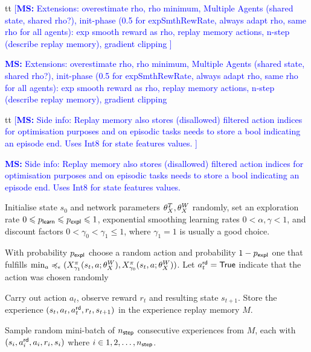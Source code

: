 \documentclass[envcountsame]{llncs}
\newcommand\MS[2][r]{\ifx t#1 \textcolor{blue}{[\textbf{MS:} #2]}
  \else \begin{center}\textcolor{blue}{\textbf{MS:} #2} \end{center} \fi}
\begin{document}
\MS[t]{Extensions: overestimate rho, rho minimum, Multiple Agents (shared state,  shared rho?),
  init-phase (0.5 for expSmthRewRate, always adapt rho, same rho for all agents): exp smooth reward
  as rho, replay memory actions, n-step (describe replay memory), gradient clipping }
\MS[t]{Side info: Replay memory also stores (disallowed) filtered action indices for optimisation purposes and on
episodic tasks needs to store a bool indicating an episode end. Uses Int8 for state features values.  }


\begin{algorithm}[t!]
  \begin{algorithmic}[1]
    \State{}Initialise state \(s_{0}\) and network parameters \(\theta_X^{T}, \theta_X^{W}\) randomly, set
    an exploration rate \(0 \leqslant p_{\mathsf{learn}} \leqslant p_{\mathsf{expl}} \leqslant 1\), exponential smoothing learning rates
    \(0 < \alpha, \gamma < 1\), and discount factors
    \(0 < \gamma_{0} < \gamma_{1} \leqslant 1\), where \(\gamma_{1} = 1\) is
    usually a good choice.
    \State{}%
    \begin{minipage}[t]{\dimexpr\textwidth-\leftmargin-\labelsep-\labelwidth}
      With probability \(p_{\mathsf{expl}}\) choose a random action and
      probability \(1-p_{\mathsf{expl}}\) one that fulfills
      \(\min_{a}\preccurlyeq_{\epsilon}(X^{\pi}_{\gamma_{1}}(s_{t},a; \theta_X^{W}{}),X^\pi_ {\gamma_{0}}(s_{t},a;
      \theta_X^{W}{}))\). Let \(a_{t}^{\mathsf{rd}} = \mathsf{True}\) indicate that the action was chosen
      randomly
    \end{minipage}
    \State{}%
    \begin{minipage}[t]{\dimexpr\textwidth-\leftmargin-\labelsep-\labelwidth}
    Carry out action \(a_{t}\), observe reward \(r_{t}\) and resulting state \(s_{t+1}\).
    Store the experience \((s_{t}, a_{t}, a_{t}^{\mathsf{rd}}, r_{t}, s_{t+1})\) in the experience replay
    memory \(M\).
    \end{minipage}
    \State{}%
    \begin{minipage}[t]{\dimexpr\textwidth-\leftmargin-\labelsep-\labelwidth-\leftmargin+2pt}
      Sample random mini-batch of \(n_{\mathsf{step}}\) consecutive experiences from \(M\), each with
      \((s_{i}, a_{i}^{\mathsf{rd}}, a_{i}, r_{i}, s_{i})\) where \(i \in {1,2,\ldots,n_{\mathsf{step}}}\).
    \end{minipage}

\end{algorithmic}
\end{algorithm}
\end{document}
